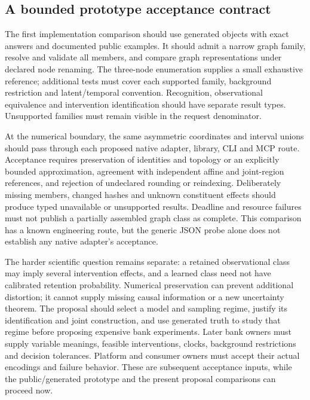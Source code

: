 \subsection{A bounded prototype acceptance contract}

The first implementation comparison should use generated objects with exact
answers and documented public examples. It should admit a narrow graph family,
resolve and validate all members, and compare graph representations under
declared node renaming. The three-node enumeration supplies a small exhaustive
reference; additional tests must cover each supported family, background
restriction and latent/temporal convention. Recognition, observational
equivalence and intervention identification should have separate result types.
Unsupported families must remain visible in the request denominator.

At the numerical boundary, the same asymmetric coordinates and interval unions
should pass through each proposed native adapter, library, CLI and MCP route.
Acceptance requires preservation of identities and topology or an explicitly
bounded approximation, agreement with independent affine and joint-region
references, and rejection of undeclared rounding or reindexing. Deliberately
missing members, changed hashes and unknown constituent effects should produce
typed unavailable or unsupported results. Deadline and resource failures must
not publish a partially assembled graph class as complete. This comparison
has a known engineering route, but the generic JSON probe alone does not
establish any native adapter's acceptance.
\citep{exec16_topology_contract}

The harder scientific question remains separate: a retained observational
class may imply several intervention effects, and a learned class need not
have calibrated retention probability. Numerical preservation can prevent
additional distortion; it cannot supply missing causal information or a new
uncertainty theorem. The proposal should select a model and sampling regime,
justify its identification and joint construction, and use generated truth to
study that regime before proposing expensive bank experiments. Later bank
owners must supply variable meanings, feasible interventions, clocks,
background restrictions and decision tolerances. Platform and consumer owners
must accept their actual encodings and failure behavior. These are subsequent
acceptance inputs, while the public/generated prototype and the present
proposal comparisons can proceed now.
\citep{exec16_topology_contract}
\label{exec16:topology-end}
